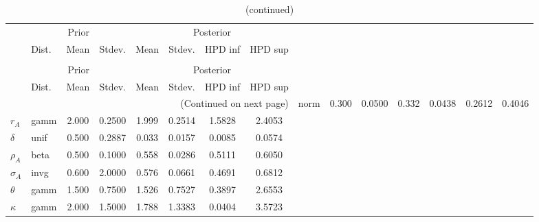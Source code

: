  
\begin{center}
\begin{longtable}{llcccccc} 
\caption{Results from Metropolis-Hastings (parameters)}
 \label{Table:MHPosterior:1}\\
\toprule 
  & \multicolumn{3}{c}{Prior}  &  \multicolumn{4}{c}{Posterior} \\
  \cmidrule(r{.75em}){2-4} \cmidrule(r{.75em}){5-8}
  & Dist. & Mean  & Stdev. & Mean & Stdev. & HPD inf & HPD sup\\
\midrule \endfirsthead 
\caption{(continued)}\\\toprule 
  & \multicolumn{3}{c}{Prior}  &  \multicolumn{4}{c}{Posterior} \\
  \cmidrule(r{.75em}){2-4} \cmidrule(r{.75em}){5-8}
  & Dist. & Mean  & Stdev. & Mean & Stdev. & HPD inf & HPD sup\\
\midrule \endhead 
\bottomrule \multicolumn{8}{r}{(Continued on next page)} \endfoot 
\bottomrule \endlastfoot 
${\alpha}$ & norm &   0.300 & 0.0500 &   0.332& 0.0438 &  0.2612 &  0.4046 \\ 
${r_{A}}$ & gamm &   2.000 & 0.2500 &   1.999& 0.2514 &  1.5828 &  2.4053 \\ 
${\delta}$ & unif &   0.500 & 0.2887 &   0.033& 0.0157 &  0.0085 &  0.0574 \\ 
${\rho_A}$ & beta &   0.500 & 0.1000 &   0.558& 0.0286 &  0.5111 &  0.6050 \\ 
${\sigma_A}$ & invg &   0.600 & 2.0000 &   0.576& 0.0661 &  0.4691 &  0.6812 \\ 
${\theta}$ & gamm &   1.500 & 0.7500 &   1.526& 0.7527 &  0.3897 &  2.6553 \\ 
${\kappa}$ & gamm &   2.000 & 1.5000 &   1.788& 1.3383 &  0.0404 &  3.5723 \\ 
\end{longtable}
 \end{center}
